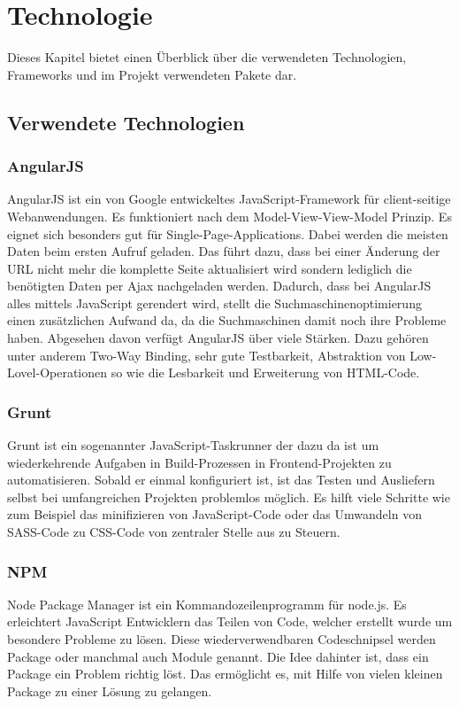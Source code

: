 \chapter{Technologie}
\label{chap_2}

Dieses Kapitel bietet einen Überblick über die verwendeten Technologien, Frameworks und im Projekt verwendeten Pakete dar.

\section{Verwendete Technologien}
\subsection{AngularJS}
AngularJS ist ein von Google entwickeltes JavaScript-Framework für client-seitige Webanwendungen. Es funktioniert nach dem Model-View-View-Model Prinzip. Es eignet sich besonders gut für Single-Page-Applications. Dabei werden die meisten Daten beim ersten Aufruf geladen. Das führt dazu, dass bei einer Änderung der URL nicht mehr die komplette Seite aktualisiert wird sondern lediglich die benötigten Daten per Ajax nachgeladen werden. Dadurch, dass bei AngularJS alles mittels JavaScript gerendert wird, stellt die Suchmaschinenoptimierung einen zusätzlichen Aufwand da, da die Suchmaschinen damit noch ihre Probleme haben. Abgesehen davon verfügt AngularJS über viele Stärken. Dazu gehören unter anderem Two-Way Binding, sehr gute Testbarkeit, Abstraktion von Low-Lovel-Operationen so wie die Lesbarkeit und Erweiterung von HTML-Code. 

\subsection{Grunt}
Grunt ist ein sogenannter JavaScript-Taskrunner der dazu da ist um wiederkehrende Aufgaben in Build-Prozessen in Frontend-Projekten zu automatisieren. Sobald er einmal konfiguriert ist, ist das Testen und Ausliefern selbst bei umfangreichen Projekten problemlos möglich. Es hilft viele Schritte wie zum Beispiel das minifizieren von JavaScript-Code oder das Umwandeln von SASS-Code zu CSS-Code von zentraler Stelle aus zu Steuern. 

\subsection{NPM}
Node Package Manager ist ein Kommandozeilenprogramm für node.js. Es erleichtert JavaScript Entwicklern das Teilen von Code, welcher erstellt wurde um besondere Probleme zu lösen. Diese wiederverwendbaren Codeschnipsel werden Package oder manchmal auch Module genannt. Die Idee dahinter ist, dass ein Package ein Problem richtig löst. Das ermöglicht es, mit Hilfe von vielen kleinen Package zu einer Lösung zu gelangen.
  
